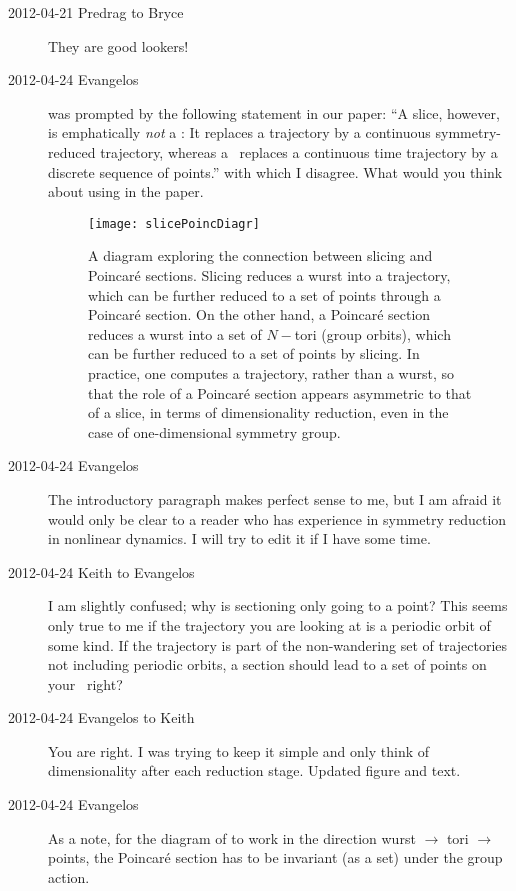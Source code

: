 \begin{description}
\item[2012-04-21 Predrag to Bryce] They are good lookers!

\item[2012-04-24 Evangelos]  was prompted by
the following statement in our paper: ``A slice, however, is emphatically
\emph{not} a \PoincSec: It replaces a trajectory by a continuous
symmetry-reduced trajectory, whereas a \PoincSec\ replaces a continuous
time trajectory by a discrete sequence of points.'' with which I
disagree. What would you think about using 
in the paper.

\begin{figure}
\centering
 \texttt{[image: slicePoincDiagr]}
\caption{A diagram exploring the connection between slicing and
Poincar\'e sections. Slicing reduces a wurst into a trajectory, which can
be further reduced to a set of points through a Poincar\'e section. On
the other hand, a Poincar\'e section reduces a wurst into a set of
$N-$tori (group orbits), which can be further reduced to a set of points
by slicing. In practice, one computes a trajectory, rather than a wurst,
so that the role of a Poincar\'e section appears asymmetric to that of a
slice, in terms of dimensionality reduction, even in the case of
one-dimensional symmetry group.
}
 \label{fig:slicePoincDiagr}
\end{figure}

\item[2012-04-24 Evangelos]  The introductory paragraph makes perfect
sense to me, but I am afraid it would only be clear to a reader who has
experience in symmetry reduction in nonlinear dynamics. I will try to
edit it if I have some time.

\item[2012-04-24 Keith to Evangelos]  I am slightly confused; why is
sectioning only going to a point?  This seems only true to me if the
trajectory you are looking at is a periodic orbit of some kind.  If the
trajectory is part of the non-wandering set of trajectories not including
periodic orbits, a section should lead to a set of points on your
\PoincSec\, right?

\item[2012-04-24 Evangelos to Keith] You are right. I was trying to keep it
simple and only think of dimensionality after each reduction stage.
Updated figure and text.

\item[2012-04-24 Evangelos] As a note, for the diagram of
 to work in the direction wurst $\rightarrow$
tori $\rightarrow$ points, the Poincar\'e section has to be invariant (as
a set) under the group action.


\end{description}
